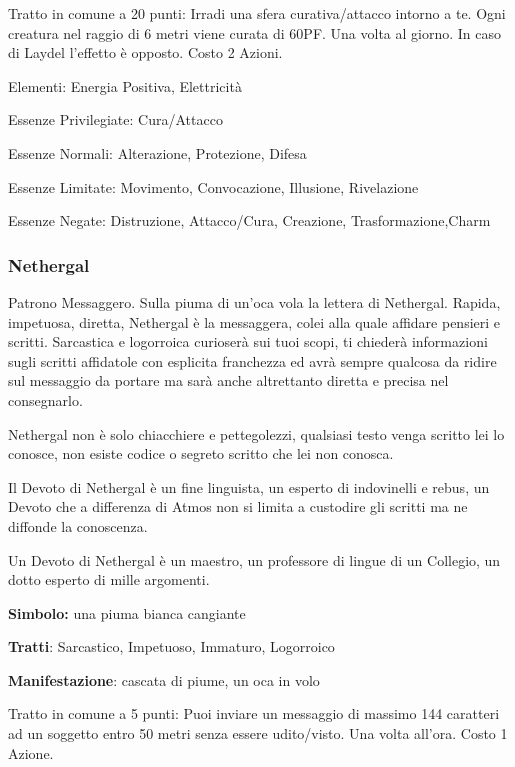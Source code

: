 \documentclass[a4paper,11pt,twoside,openany]{book}
\begin{document}
Tratto in comune a 20 punti: Irradi una sfera curativa/attacco intorno a te. Ogni creatura nel raggio di 6 metri viene curata di 60PF. Una volta al giorno. In caso di Laydel l'effetto è opposto. Costo 2 Azioni.

\bigskip

Elementi: Energia Positiva, Elettricità

\bigskip

Essenze Privilegiate: Cura/Attacco

Essenze Normali: Alterazione, Protezione, Difesa

Essenze Limitate: Movimento, Convocazione, Illusione, Rivelazione

Essenze Negate: Distruzione, Attacco/Cura, Creazione, Trasformazione,Charm

\subsubsection{Nethergal}

\label{nethergal}

Patrono Messaggero. Sulla piuma di un'oca vola la lettera di Nethergal. Rapida, impetuosa, diretta, Nethergal è la messaggera, colei alla quale affidare pensieri e scritti. Sarcastica e logorroica curioserà sui tuoi scopi, ti chiederà informazioni sugli scritti affidatole con esplicita franchezza ed avrà sempre qualcosa da ridire sul messaggio da portare ma sarà anche altrettanto diretta e precisa nel consegnarlo.

Nethergal non è solo chiacchiere e pettegolezzi, qualsiasi testo venga scritto lei lo conosce, non esiste codice o segreto scritto che lei non conosca.

Il Devoto di Nethergal è un fine linguista, un esperto di indovinelli e rebus, un Devoto che a differenza di Atmos non si limita a custodire gli scritti ma ne diffonde la conoscenza.

Un Devoto di Nethergal è un maestro, un professore di lingue di un Collegio, un dotto esperto di mille argomenti.

\textbf{Simbolo:} una piuma bianca cangiante

\textbf{Tratti}: Sarcastico, Impetuoso, Immaturo, Logorroico

\textbf{Manifestazione}: cascata di piume, un oca in volo

\bigskip

Tratto in comune a 5 punti: Puoi inviare un messaggio di massimo 144 caratteri ad un soggetto entro 50 metri senza essere udito/visto. Una volta all'ora. Costo 1 Azione.
\end{document}
